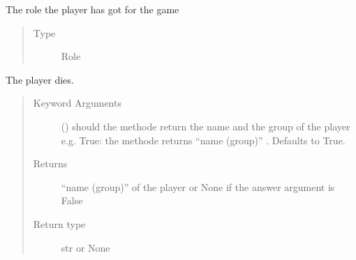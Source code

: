 \documentclass[letterpaper,10pt,english]{sphinxmanual}
\begin{document}
\begin{fulllineitems}
\begin{fulllineitems}
\begin{quote}
\begin{description}
\end{description}\end{quote}

\end{fulllineitems}


\begin{fulllineitems}
\label{\detokenize{chatwolf:chatwolf.player.Player.role}}
The role the player has got for the game
\begin{quote}\begin{description}
\item[{Type}] \leavevmode
Role

\end{description}\end{quote}

\end{fulllineitems}


\begin{fulllineitems}
\label{\detokenize{chatwolf:chatwolf.player.Player.die}}
The player dies.
\begin{quote}\begin{description}
\item[{Keyword Arguments}] \leavevmode
{} (\sphinxstyleliteralemphasis{\sphinxupquote{, }}) \textendash{} should the methode return the name and the group of the player
e.g. True: the methode returns “name (group)”  . Defaults to True.

\item[{Returns}] \leavevmode
“name (group)” of the player or None if the answer argument is False

\item[{Return type}] \leavevmode
str or None

\end{description}\end{quote}

\end{fulllineitems}


\end{fulllineitems}
\end{document}

